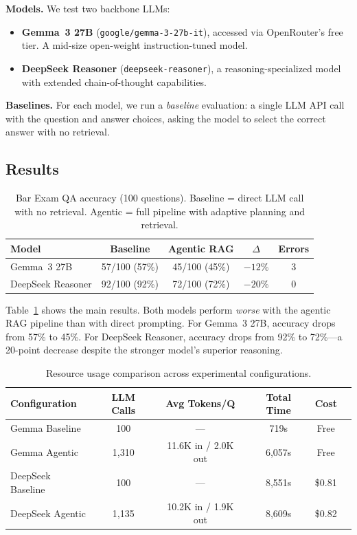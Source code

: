 \documentclass{article}
\begin{document}
\textbf{Models.} We test two backbone LLMs:
\begin{itemize}[leftmargin=*,nosep]
    \item \textbf{Gemma~3 27B} (\texttt{google/gemma-3-27b-it}), accessed via OpenRouter's free tier. A mid-size open-weight instruction-tuned model.
    \item \textbf{DeepSeek Reasoner} (\texttt{deepseek-reasoner}), a reasoning-specialized model with extended chain-of-thought capabilities.
\end{itemize}

\textbf{Baselines.} For each model, we run a \emph{baseline} evaluation: a single LLM API call with the question and answer choices, asking the model to select the correct answer with no retrieval.

\subsection{Results}

\begin{table}[t]
\centering
\caption{Bar Exam QA accuracy (100 questions). Baseline = direct LLM call with no retrieval. Agentic = full pipeline with adaptive planning and retrieval.}
\label{tab:results}
\begin{tabular}{lcccc}
\toprule
\textbf{Model} & \textbf{Baseline} & \textbf{Agentic RAG} & \textbf{$\Delta$} & \textbf{Errors} \\
\midrule
Gemma~3 27B & 57/100 (57\%) & 45/100 (45\%) & $-12\%$ & 3 \\
DeepSeek Reasoner & 92/100 (92\%) & 72/100 (72\%) & $-20\%$ & 0 \\
\bottomrule
\end{tabular}
\end{table}

Table~\ref{tab:results} shows the main results. Both models perform \emph{worse} with the agentic RAG pipeline than with direct prompting. For Gemma~3 27B, accuracy drops from 57\% to 45\%. For DeepSeek Reasoner, accuracy drops from 92\% to 72\%---a 20-point decrease despite the stronger model's superior reasoning.

\begin{table}[t]
\centering
\caption{Resource usage comparison across experimental configurations.}
\label{tab:resources}
\begin{tabular}{lccccc}
\toprule
\textbf{Configuration} & \textbf{LLM Calls} & \textbf{Avg Tokens/Q} & \textbf{Total Time} & \textbf{Cost} \\
\midrule
Gemma Baseline & 100 & --- & 719s & Free \\
Gemma Agentic & 1,310 & 11.6K in / 2.0K out & 6,057s & Free \\
DeepSeek Baseline & 100 & --- & 8,551s & \$0.81 \\
DeepSeek Agentic & 1,135 & 10.2K in / 1.9K out & 8,609s & \$0.82 \\
\bottomrule
\end{tabular}
\end{table}
\end{document}
